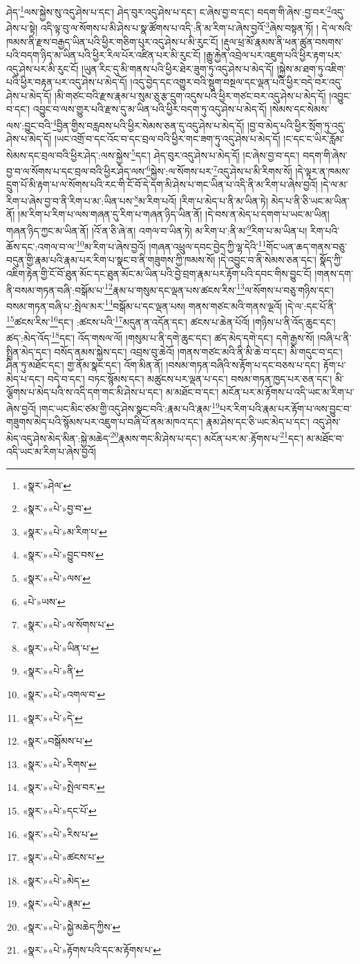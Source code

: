 ཤེད་\footnote{«སྣར་»ཤེལ་}ལས་སྐྱེས་སུ་འདུ་ཤེས་པ་དང་། ཤེད་བུར་འདུ་ཤེས་པ་དང་། ང་ཞེས་བྱ་བ་དང་། བདག་གི་ཞེས་:བྱ་བར་\footnote{«སྣར་»«པེ་»བྱ་བ་}འདུ་ཤེས་པ་སྟེ། འདི་ལྟ་བུ་ལ་སོགས་པ་མི་ཤེས་པ་སྣ་ཚོགས་པ་འདི་:ནི་མ་རིག་པ་ཞེས་བྱའོ་\footnote{«སྣར་»«པེ་»མ་རིག་པ་}ཞེས་བསྟན་ཏོ། །
དེ་ལ་སའི་ཁམས་ནི་རྫས་བརྒྱད་ཡིན་པའི་ཕྱིར་གཅིག་པུར་འདུ་ཤེས་པ་མི་རུང་ངོ། །རྡུལ་ཕྲ་མོ་རྣམས་ནི་ཕན་ཚུན་བསགས་པའི་བདག་ཉིད་མ་ཡིན་པའི་ཕྱིར་རིལ་པོར་འཛིན་པར་མི་རུང་ངོ། །རྒྱུ་རྐྱེན་འབྲེལ་པར་འཇུག་པའི་ཕྱིར་རྟག་པར་འདུ་ཤེས་པར་མི་རུང་ངོ། །ཡུན་རིང་དུ་མི་གནས་པའི་ཕྱིར་ཐེར་ཟུག་ཏུ་འདུ་ཤེས་པ་མེད་དོ། །སྐྱེས་མ་ཐག་ཏུ་འཇིག་པའི་ཕྱིར་བརྟན་པར་འདུ་ཤེས་པ་མེད་དོ། །འདུ་བྱེད་དང་འགྱུར་བའི་སྡུག་བསྔལ་དང་ལྡན་པའི་ཕྱིར་བདེ་བར་འདུ་ཤེས་པ་མེད་དོ། །མི་གཙང་བའི་རྫས་རྣམ་པ་སུམ་ཅུ་རྩ་དྲུག་འདུས་པའི་ཕྱིར་གཙང་བར་འདུ་ཤེས་པ་མེད་དོ། །འབྱུང་བ་དང་། འབྱུང་བ་ལས་གྱུར་པའི་རྫས་དུ་མ་ཡིན་པའི་ཕྱིར་བདག་ཏུ་འདུ་ཤེས་པ་མེད་དོ། །སེམས་དང་སེམས་ལས་:བྱུང་བའི་\footnote{«སྣར་»«པེ་»བྱུང་བས་}བྱིན་གྱིས་བརླབས་པའི་ཕྱིར་སེམས་ཅན་དུ་འདུ་ཤེས་པ་མེད་དོ། །བྱ་བ་མེད་པའི་ཕྱིར་སྲོག་ཏུ་འདུ་ཤེས་པ་མེད་དོ། །ཡང་འགྲོ་བ་དང་འོང་བ་དང་བྲལ་བའི་ཕྱིར་གང་ཟག་ཏུ་འདུ་ཤེས་པ་མེད་དོ། །ང་དང་ང་ཡིར་རློམ་སེམས་དང་བྲལ་བའི་ཕྱིར་ཤེད་:ལས་སྐྱེས་\footnote{«སྣར་»«པེ་»ལས་}དང་། ཤེད་བུར་འདུ་ཤེས་པ་མེད་དོ། །ང་ཞེས་བྱ་བ་དང་། བདག་གི་ཞེས་བྱ་བ་ལ་སོགས་པ་དང་བྲལ་བའི་ཕྱིར་ཤེད་ལས་\footnote{«པེ་»ཡས་}སྐྱེས་:ལ་སོགས་པར་\footnote{«སྣར་»«པེ་»ལ་སོགས་པ་}འདུ་ཤེས་པ་མི་རིགས་སོ། །དེ་ལྟར་ན་ཁམས་དྲུག་པོ་མི་རྟག་པ་ལ་སོགས་པའི་རང་གི་ངོ་བོ་དེ་དག་མི་ཤེས་པ་གང་ཡིན་པ་འདི་ནི་མ་རིག་པ་ཞེས་བྱའོ། །དེ་ལ་མ་རིག་པ་ཞེས་བྱ་བ་ནི་རིག་པ་མ་:ཡིན་པས་\footnote{«སྣར་»«པེ་»ཡིན་པ་}མ་རིག་པའོ། །རིག་པ་མེད་པ་ནི་མ་ཡིན་ཏེ། མེད་པ་ནི་ཅི་ཡང་མ་ཡིན་ནོ། །མ་རིག་པ་རིག་པ་ལས་གཞན་དུ་རིག་པ་གཞན་ཉིད་ཡིན་ནོ། །དེ་བས་ན་མེད་པ་དགག་པ་ཡང་མ་ཡིན། གཞན་ཉིད་ཀྱང་མ་ཡིན་ནོ། །འོ་ན་ཅི་ཞེ་ན། འགལ་བ་ཡིན་ཏེ། མ་རིག་པ་:ནི་མ་\footnote{«སྣར་»«པེ་»ནི་}རིག་པ་མ་ཡིན་པ། རིག་པའི་ཆོས་དང་:འགལ་བ་ལ་\footnote{«སྣར་»«པེ་»འགལ་བ་}མ་རིག་པ་ཞེས་བྱའོ། །གཞན་འཕྲུལ་དབང་བྱེད་ཀྱི་ལྷ་དེའི་\footnote{«སྣར་»«པེ་»དེ་}གོང་ཡན་ཆད་གནས་བཅུ་བདུན་གྱི་རྣམ་པའི་རྣམ་པར་རིག་པ་སྣང་བ་ནི་གཟུགས་ཀྱི་ཁམས་སོ། །དེ་འབྱུང་བ་ནི་སེམས་ཅན་དང་། སྣོད་ཀྱི་འཇིག་རྟེན་གྱི་ངོ་བོ་ཐུན་མོང་དང་ཐུན་མོང་མ་ཡིན་པའི་བྱེ་བྲག་རྣམ་པར་རྟོག་པའི་དབང་གིས་བྱུང་ངོ། །གནས་དག་ནི་བསམ་གཏན་བཞི་:བསྒོམ་པ་\footnote{«སྣར་»བསྒོམས་པ་}རྣམ་པ་གསུམ་དང་ལྡན་པས་ཚངས་རིས་\footnote{«སྣར་»«པེ་»རིགས་}ལ་སོགས་པ་བཅུ་གཉིས་དང་། བསམ་གཏན་བཞི་པ་:སྤེལ་མར་\footnote{«སྣར་»«པེ་»སྤེལ་བར་}བསྒོམ་པ་དང་ལྡན་པས། གནས་གཙང་མའི་གནས་ལྔའོ། །དེ་ལ་:དང་པོ་ནི་\footnote{«སྣར་»«པེ་»དང་པོ་}ཚངས་རིས་\footnote{«སྣར་»«པེ་»རིས་པ་}དང་། :ཚངས་པའི་\footnote{«སྣར་»«པེ་»ཚངས་པ་}མདུན་ན་འདོན་དང་། ཚངས་པ་ཆེན་པོའོ། །གཉིས་པ་ནི་འོད་ཆུང་དང་། ཚད་:མེད་འོད་\footnote{«སྣར་»«པེ་»མེད་}དང་། འོད་གསལ་ལོ། །གསུམ་པ་ནི་དགེ་ཆུང་དང་། ཚད་མེད་དགེ་དང་། དགེ་རྒྱས་སོ། །བཞི་པ་ནི་སྤྲིན་མེད་དང་། བསོད་ནམས་སྐྱེས་དང་། འབྲས་བུ་ཆེའོ། །གནས་གཙང་མའི་ནི་མི་ཆེ་བ་དང་། མི་གདུང་བ་དང་། ཤིན་ཏུ་མཐོང་དང་། གྱ་ནོམ་སྣང་དང་། འོག་མིན་ནོ། །བསམ་གཏན་བཞིའི་ས་རྟོག་པ་དང་བཅས་པ་དང་། རྟོག་པ་མེད་པ་དང་། བདེ་བ་དང་། བཏང་སྙོམས་དང་། མཚུངས་པར་ལྡན་པ་དང་། བསམ་གཏན་ཁྱད་པར་ཅན་དང་། མི་ལྕོགས་པ་མེད་པའི་ས་འདི་དག་གང་མི་ཤེས་པ་དང་། མ་མཐོང་བ་དང་། མངོན་པར་མ་རྟོགས་པ་འདི་ཡང་མ་རིག་པ་ཞེས་བྱའོ། །གང་ཡང་མིང་ཙམ་གྱི་འདུ་ཤེས་སྣང་བའི་:རྣམ་པའི་རྣམ་\footnote{«སྣར་»«པེ་»རྣམ་}པར་རིག་པའི་རྣམ་པར་རྟོག་པ་ལས་བྱུང་བ་གཟུགས་མེད་པའི་སྙོམས་པར་འཇུག་པ་བཞི་པོ་ནམ་མཁའ་དང་། རྣམ་ཤེས་དང་ཅི་ཡང་མེད་པ་དང་། འདུ་ཤེས་མེད་འདུ་ཤེས་མེད་མིན་:སྐྱེ་མཆེད་\footnote{«སྣར་»«པེ་»སྐྱེ་མཆེད་ཀྱིས་}རྣམས་གང་མི་ཤེས་པ་དང་། མངོན་པར་མ་:རྟོགས་པ་\footnote{«སྣར་»«པེ་»རྟོགས་པའི་དང་མ་རྟོགས་པ་}དང་། མ་མཐོང་བ་འདི་ཡང་མ་རིག་པ་ཞེས་བྱའོ། 